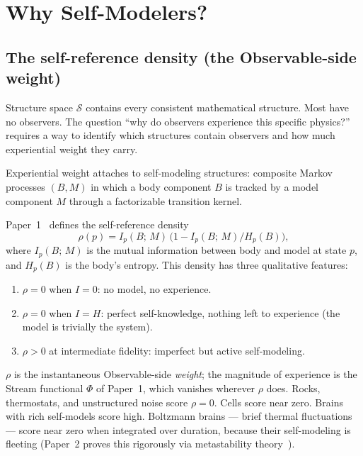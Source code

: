 
\section{Why Self-Modelers?}
\label{sec:why-self-modelers}

\subsection{The self-reference density (the Observable-side weight)}
\label{subsec:experiential-measure}

Structure space $\mathcal{S}$ contains every consistent mathematical
structure.  Most have no observers.  The question ``why do observers
experience this specific physics?'' requires a way to identify which
structures contain observers and how much experiential weight they
carry.

\begin{postulate}
\label{post:self-modeling}
Experiential weight attaches to self-modeling structures: composite
Markov processes $(B, M)$ in which a body component $B$ is tracked by
a model component $M$ through a factorizable transition kernel.
\end{postulate}

Paper~1~\citep{ehrlich2026measure} defines the self-reference density
\begin{equation}
\label{eq:rho}
\rho(p) = I_p(B;\,M)\,\bigl(1 - I_p(B;\,M) / H_p(B)\bigr),
\end{equation}
where $I_p(B;\,M)$ is the mutual information between body and model at
state $p$, and $H_p(B)$ is the body's entropy.  This density has three
qualitative features:
\begin{enumerate}[nosep]
\item $\rho = 0$ when $I = 0$: no model, no experience.
\item $\rho = 0$ when $I = H$: perfect self-knowledge, nothing left
  to experience (the model is trivially the system).
\item $\rho > 0$ at intermediate fidelity: imperfect but active
  self-modeling.
\end{enumerate}
$\rho$ is the instantaneous Observable-side \emph{weight}; the magnitude
of experience is the Stream functional $\Phi$ of Paper~1, which vanishes
wherever $\rho$ does.  Rocks, thermostats, and unstructured noise score $\rho = 0$.  Cells
score near zero.  Brains with rich self-models score high.  Boltzmann
brains --- brief thermal fluctuations --- score near zero when
integrated over duration, because their self-modeling is fleeting
(Paper~2 proves this rigorously via metastability
theory~\citep{ehrlich2026bb}).

